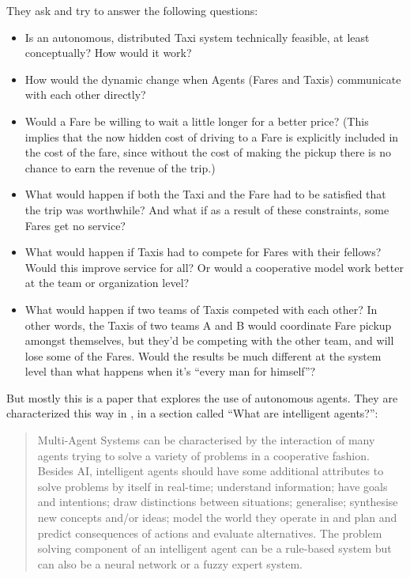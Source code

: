 \documentclass[11pt,letterpaper,onecolumn,twoside,openright,final]{report}
\begin{document}
They ask and try to answer the following questions:
\begin{itemize}
  \item{Is an autonomous, distributed Taxi system technically feasible, at least conceptually?
    How would it work?}
  \item{How would the dynamic change when Agents (Fares and Taxis) communicate with each other directly?}
  \item{Would a Fare be willing to wait a little longer for a better price?
    (This implies that the now hidden cost of driving to a Fare is explicitly included in the cost of the fare, since without the cost of making the pickup there is no chance to earn the revenue of the trip.)}
  \item{What would happen if both the Taxi and the Fare had to be satisfied that the trip was worthwhile?
    And what if as a result of these constraints, some Fares get no service?}
  \item{What would happen if Taxis had to compete for Fares with their fellows?
    Would this improve service for all?
    Or would a cooperative model work better at the team or organization level?}
  \item{What would happen if two teams of Taxis competed with each other?
    In other words, the Taxis of two teams A and B would coordinate Fare pickup amongst themselves, but they’d be competing with the other team, and will lose some of the Fares.
    Would the results be much different at the system level than what happens when it's ``every man for himself''?}
\end{itemize}

But mostly this is a paper that explores the use of autonomous agents.
They are characterized this way in \cite{roozemond2000act}, in a section called ``What are intelligent agents?'':

\singlespacing
\begin{quote}
Multi-Agent Systems can be characterised by the interaction of many agents trying to solve a variety of problems in a cooperative fashion.
Besides AI, intelligent agents should have some additional attributes to solve problems by itself in real-time; understand information; have goals and intentions; draw distinctions between situations; generalise; synthesise new concepts and/or ideas; model the world they operate in and plan and predict consequences of actions and evaluate alternatives.
The problem solving component of an intelligent agent can be a rule-based system but can also be a neural network or a fuzzy expert system.
\end{quote}
\onehalfspacing
\end{document}

